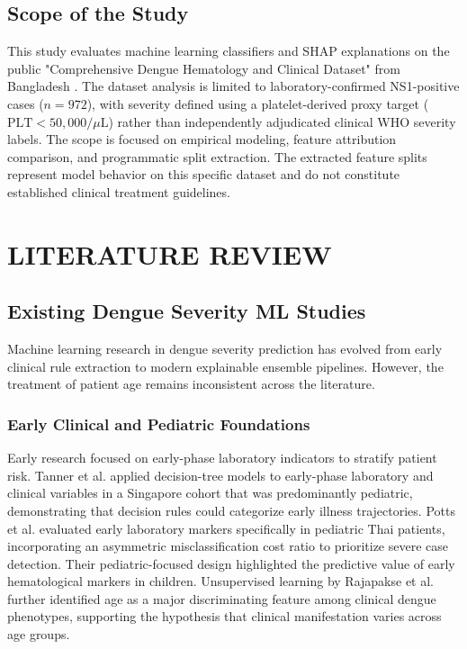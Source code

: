 \documentclass[12pt, a4paper]{report}
\begin{document}
\section{Scope of the Study}
This study evaluates machine learning classifiers and SHAP explanations on the public "Comprehensive Dengue Hematology and Clinical Dataset" from Bangladesh \cite{mendeley2026}. The dataset analysis is limited to laboratory-confirmed NS1-positive cases ($n=972$), with severity defined using a platelet-derived proxy target ($\text{PLT} < 50,000 / \mu\text{L}$) rather than independently adjudicated clinical WHO severity labels. The scope is focused on empirical modeling, feature attribution comparison, and programmatic split extraction. The extracted feature splits represent model behavior on this specific dataset and do not constitute established clinical treatment guidelines.

\chapter{LITERATURE REVIEW}

\section{Existing Dengue Severity ML Studies}
Machine learning research in dengue severity prediction has evolved from early clinical rule extraction to modern explainable ensemble pipelines. However, the treatment of patient age remains inconsistent across the literature.

\subsection{Early Clinical and Pediatric Foundations}
Early research focused on early-phase laboratory indicators to stratify patient risk. Tanner et al. \cite{tanner2008} applied decision-tree models to early-phase laboratory and clinical variables in a Singapore cohort that was predominantly pediatric, demonstrating that decision rules could categorize early illness trajectories. Potts et al. \cite{potts2010} evaluated early laboratory markers specifically in pediatric Thai patients, incorporating an asymmetric misclassification cost ratio to prioritize severe case detection. Their pediatric-focused design highlighted the predictive value of early hematological markers in children. Unsupervised learning by Rajapakse et al. \cite{rajapakse2014} further identified age as a major discriminating feature among clinical dengue phenotypes, supporting the hypothesis that clinical manifestation varies across age groups.
\end{document}
